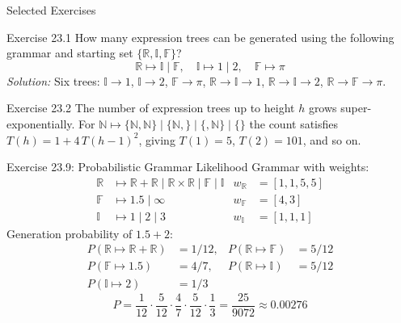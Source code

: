 \documentclass[aspectratio=169,10pt]{beamer}
\begin{document}
\begin{frame}[allowframebreaks]{Selected Exercises}
  \begin{block}{Exercise 23.1}
    How many expression trees can be generated using the following grammar
    and starting set $\{\mathbb{R}, \mathbb{I}, \mathbb{F}\}$?
    \[
      \mathbb{R} \mapsto \mathbb{I} \mid \mathbb{F}, \quad
      \mathbb{I} \mapsto 1 \mid 2, \quad
      \mathbb{F} \mapsto \pi
    \]
    \textit{Solution:} Six trees: $\mathbb{I}\!\to\!1$, $\mathbb{I}\!\to\!2$,
    $\mathbb{F}\!\to\!\pi$, $\mathbb{R}\!\to\!\mathbb{I}\!\to\!1$,
    $\mathbb{R}\!\to\!\mathbb{I}\!\to\!2$, $\mathbb{R}\!\to\!\mathbb{F}\!\to\!\pi$.
  \end{block}

  \begin{block}{Exercise 23.2}
    The number of expression trees up to height $h$ grows super-exponentially.
    For $\mathbb{N}\mapsto\{\mathbb{N},\mathbb{N}\}\mid\{\mathbb{N},\}\mid\{,\mathbb{N}\}\mid\{\}$
    the count satisfies $T(h) = 1 + 4\,T(h-1)^2$, giving
    $T(1)=5$, $T(2)=101$, and so on.
  \end{block}

  \framebreak

  \begin{block}{Exercise 23.9: Probabilistic Grammar Likelihood}
    Grammar with weights:
    \begin{align*}
      \mathbb{R} &\mapsto \mathbb{R}+\mathbb{R}\mid\mathbb{R}\!\times\!\mathbb{R}\mid\mathbb{F}\mid\mathbb{I}
        & w_{\mathbb{R}} &= [1,1,5,5] \\
      \mathbb{F} &\mapsto 1.5 \mid \infty & w_{\mathbb{F}} &= [4,3] \\
      \mathbb{I} &\mapsto 1\mid 2\mid 3 & w_{\mathbb{I}} &= [1,1,1]
    \end{align*}
    Generation probability of $1.5 + 2$:
    \begin{align*}
      P(\mathbb{R}\!\mapsto\!\mathbb{R}+\mathbb{R}) &= 1/12, &
      P(\mathbb{R}\!\mapsto\!\mathbb{F}) &= 5/12 \\
      P(\mathbb{F}\!\mapsto\!1.5) &= 4/7, &
      P(\mathbb{R}\!\mapsto\!\mathbb{I}) &= 5/12 \\
      P(\mathbb{I}\!\mapsto\!2) &= 1/3
    \end{align*}
    \[
      P = \frac{1}{12}\cdot\frac{5}{12}\cdot\frac{4}{7}\cdot\frac{5}{12}\cdot\frac{1}{3}
        = \frac{25}{9072} \approx 0.00276
    \]
  \end{block}


\end{frame}
\end{document}
